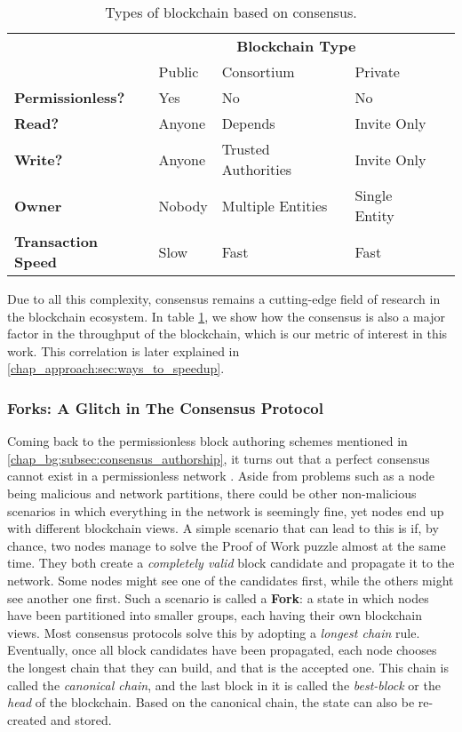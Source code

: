 \begin{table}[ht]
\centering
	\caption{Types of blockchain based on consensus.}
	\label{table:blockchain_types}
	\begin{tabular}{lllll}
													& \multicolumn{3}{c}{\textbf{Blockchain Type}} &
													\\
													& Public & Consortium          & Private       &
	\\ \cline{1-4} \multicolumn{1}{l|}{\textbf{Permissionless?}}   & Yes    & No                  &
	No            &  \\
	\multicolumn{1}{l|}{\textbf{Read?}}             & Anyone & Depends             & Invite Only   &
	\\
	\multicolumn{1}{l|}{\textbf{Write?}}            & Anyone & Trusted Authorities & Invite Only   &
	\\
	\multicolumn{1}{l|}{\textbf{Owner}}             & Nobody & Multiple Entities   & Single Entity &
	\\
	\multicolumn{1}{l|}{\textbf{Transaction Speed}} & Slow   & Fast                & Fast          &
	\\ \hline
	\end{tabular}
\end{table}

Due to all this complexity, consensus remains a cutting-edge field of research in the blockchain
ecosystem. In table \ref{table:blockchain_types}, we show how the consensus is also a major factor
in the throughput of the blockchain, which is our metric of interest in this work. This correlation
is later explained in \ref{chap_approach:sec:ways_to_speedup}.

\subsubsection{Forks: A Glitch in The Consensus Protocol}

Coming back to the permissionless block authoring schemes mentioned in
\ref{chap_bg:subsec:consensus_authorship}, it turns out that a perfect consensus cannot exist in a
permissionless network \cite{wangSurveyConsensusMechanisms2019}. Aside from problems such as a node
being malicious and network partitions, there could be other non-malicious scenarios in which
everything in the network is seemingly fine, yet nodes end up with different blockchain views. A
simple scenario that can lead to this is if, by chance, two nodes manage to solve the Proof of Work
puzzle almost at the same time. They both create a \textit{completely valid} block candidate and
propagate it to the network. Some nodes might see one of the candidates first, while the others
might see another one first. Such a scenario is called a \textbf{Fork}: a state in which nodes have
been partitioned into smaller groups, each having their own blockchain views. Most consensus
protocols solve this by adopting a \textit{longest chain} rule. Eventually, once all block
candidates have been propagated, each node chooses the longest chain that they can build, and that
is the accepted one. This chain is called the \textit{canonical chain}, and the last block in it is
called the \textit{best-block} or the \textit{head} of the blockchain. Based on the canonical chain,
the state can also be re-created and stored.

